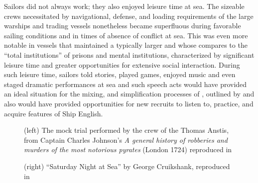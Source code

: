 Sailors did not always work; they also enjoyed leisure time at sea. The sizeable crews necessitated by navigational, defense, and loading requirements of the large warships and  trading vessels nonetheless became superfluous during favorable sailing conditions and in times of absence of conflict at sea. This was even more notable in  vessels that maintained a typically larger  and whose  \citet{Burg2001} compares to the “total institutions” of prisons and mental institutions, characterized by significant leisure time and greater opportunities for extensive social interaction. During such leisure time, sailors told stories, played games, enjoyed music and even staged dramatic performances at sea \citep[155]{Rediker2004} and such speech acts would have provided an ideal situation for the mixing,  and simplification processes of , outlined by \citet{Trudgill1986} and also would have provided opportunities for new recruits to listen to, practice, and acquire features of Ship English.

\begin{figure}
\caption{\label{fig:key:4.5} (left) The mock trial performed by the crew of the Thomas Anstis, from Captain Charles Johnson’s \textit{A general history of robberies and murders of the most notorious pyrates} (London 1724) reproduced in \citet[156]{Rediker2004}}
\end{figure}

\begin{figure}
\caption{\label{fig:key:4.6} (right) “Saturday Night at Sea” by George Cruikshank, reproduced in \citet[29]{Dibdin1841}}
\end{figure}

